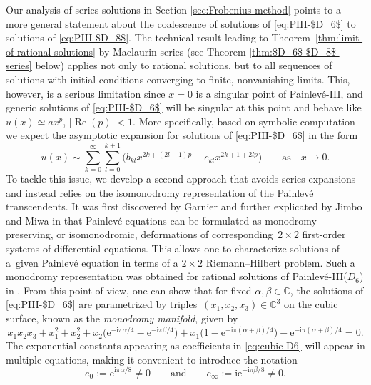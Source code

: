 \documentclass[11pt]{article}
\numberwithin{equation}{section}
\numberwithin{equation}{section}
\newcommand{\ee}{\mathrm{e}}
\newcommand{\ii}{\mathrm{i}}
\newcommand{\C}{{\mathbb{C}}}
\newcommand{\re}{\operatorname{Re}}
\begin{document}
Our analysis of series solutions in Section \ref{sec:Frobenius-method} points to a more general statement about the coalescence of solutions of \eqref{eq:PIII-$D_6$} to solutions of \eqref{eq:PIII-$D_8$}. The technical result leading to Theorem~\ref{thm:limit-of-rational-solutions} by Maclaurin series (see Theorem \ref{thm:$D_6$-$D_8$-series} below) applies not only to rational solutions, but to all sequences of solutions with initial conditions converging to finite, nonvanishing limits. This, however, is a serious limitation since $x = 0$ is a singular point of Painlev\'e-III, and generic solutions of \eqref{eq:PIII-$D_6$} will be singular at this point and behave like $u(x)\simeq ax^p$, $|{\re}(p)|< 1$. More specifically, based on symbolic computation we expect the asymptotic expansion for solutions of \eqref{eq:PIII-$D_6$} in the form
\[
u(x)\sim \sum_{k=0}^{\infty}\sum_{l=0}^{k+1}\big(b_{kl}x^{2k+(2l-1)p}+c_{kl}x^{2k+1+2lp}\big) \qquad \text{as}\quad x\to 0.
\]
To tackle this issue, we develop a second approach that avoids series expansions and instead relies on the isomonodromy representation of the Painlev\'e transcendents. It was first discovered by Garnier \cite{MR1509146} and further explicated by Jimbo and Miwa in \cite{MR625446} that Painlev\'e equations can be formulated as monodromy-preserving, or isomonodromic, deformations of corresponding~${2 \times 2}$ first-order systems of differential equations. This allows one to characterize solutions of a~given Painlev\'e equation in terms of a $2\times 2$ Riemann--Hilbert problem. Such a monodromy representation was obtained for rational solutions of Painlev\'e-III($D_6$) in \cite{BMS18}. From this point of view, one can show that for fixed $\alpha, \beta \in \C$, the solutions of \eqref{eq:PIII-$D_6$} are parametrized by triples~$(x_1, x_2, x_3) \in \C^3$ on the cubic surface, known as the \emph{monodromy manifold}, given by
\begin{equation}
 \label{eq:cubic-D6} x_1x_2x_3+x_1^2+x_2^2+x_2 \bigl(\ee^{-{\ii\pi \alpha}/{4}}-\ee^{-{\ii\pi \beta}/{4}} \bigr)+x_1 \bigl(1-\ee^{-{\ii\pi(\alpha+ \beta)}/{4}}\bigr)-\ee^{-{\ii\pi(\alpha+ \beta)}/{4}}=0.
\end{equation}
The exponential constants appearing as coefficients in \eqref{eq:cubic-D6} will appear in multiple equations, making it convenient to introduce the notation
\begin{equation}
 e_0:=\ee^{{\ii\pi\alpha}/{8}}\neq 0 \qquad \text{and} \qquad e_\infty:=\ii\ee^{-{\ii\pi\beta}/{8}}\neq 0.
 \label{eq:e0-einfty-alpha-beta}
\end{equation}
\end{document}
